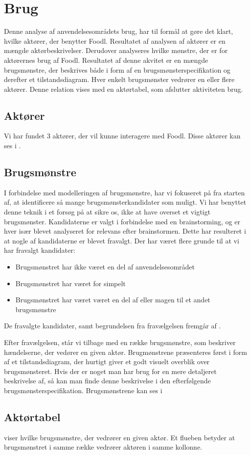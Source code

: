 \section{Brug}
\label{sec:brug}
Denne analyse af anvendelsesområdets brug, har til formål at gøre det klart, hvilke aktører, der benytter Foodl. Resultatet af analysen af aktører er en mængde aktørbeskrivelser. Derudover analyseres hvilke mønstre, der er for aktørernes brug af Foodl. Resultatet af denne akvitet er en mængde brugsmønstre, der beskrives både i form af en brugsmønsterspecifikation og derefter et tilstandsdiagram. Hver enkelt brugsmønster vedrører en eller flere aktører. Denne relation vises med en aktørtabel, som afslutter aktiviteten brug.

\subsection{Aktører}
Vi har fundet 3 aktører, der vil kunne interagere med Foodl. Disse aktører kan ses i .



\subsection{Brugsmønstre}
I forbindelse med modelleringen af brugsmønstre, har vi fokuseret på fra starten af, at identificere så mange brugsmønsterkandidater som muligt. Vi har benyttet denne teknik i et forsøg på at sikre os, ikke at have overset et vigtigt brugsmønster. Kandidaterne er valgt i forbindelse med en brainstorming, og er hver især blevet analyseret for relevans efter brainstormen. Dette har resulteret i at nogle af kandidaterne er blevet fravalgt. Der har været flere grunde til at vi har fravalgt kandidater:
\begin{itemize}
\item Brugsmønstret har ikke været en del af anvendelsesområdet
\item Brugsmønstret har været for simpelt
\item Brugsmønstret har været været en del af eller magen til et andet brugsmønstre
\end{itemize}
De fravalgte kandidater, samt begrundelsen fra fravælgelsen fremgår af .

Efter fravælgelsen, står vi tilbage med en række brugsmønstre, som beskriver hændelserne, der vedører en given aktør. Brugmønstrene præsenteres først i form af et tilstandsdiagram, der hurtigt giver et godt visuelt overblik over brugsmønsteret. Hvis der er noget man har brug for en mere detaljeret beskrivelse af, så kan man finde denne beskrivelse i den efterfølgende brugsmønsterspecifikation.
Brugsmønstrene kan ses i 


\subsection{Aktørtabel}
 viser hvilke brugsmønstre, der vedrører en given aktør. Et flueben betyder at brugsmønstret i samme række vedrører aktøren i samme kollonne.






